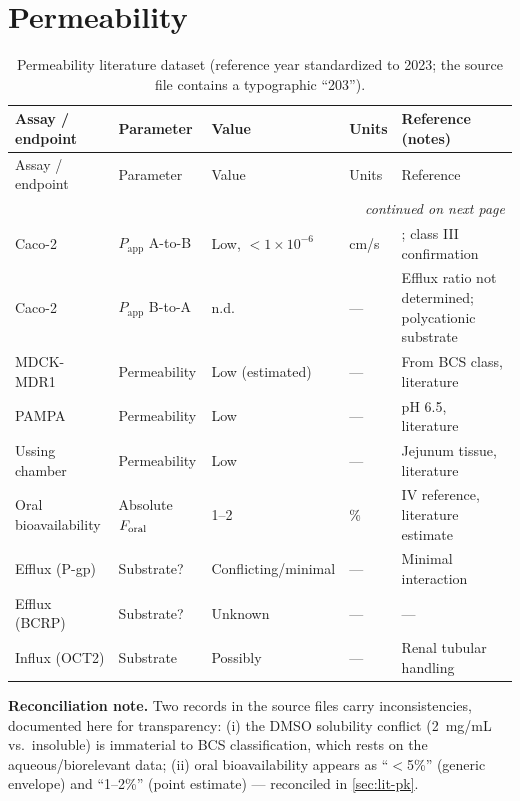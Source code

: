 \section{Permeability}
\small\setlength{\tabcolsep}{4pt}
\begin{longtable}{p{2.8cm}p{2.4cm}p{2.6cm}p{1.6cm}p{3.6cm}}
\caption{Permeability literature dataset (reference year standardized to 2023; the source file contains a typographic ``203'').}\label{tab:perm-full}\\
\toprule
Assay / endpoint & Parameter & Value & Units & Reference (notes)\\
\midrule
\endfirsthead
\toprule
Assay / endpoint & Parameter & Value & Units & Reference\\
\midrule
\endhead
\midrule
\multicolumn{5}{r}{\emph{continued on next page}}\\
\endfoot
\bottomrule
\endlastfoot
Caco-2 & $P_{\mathrm{app}}$ A-to-B & Low, $<1\times10^{-6}$ & cm/s & \citet{Asad2023}; class III confirmation\\
Caco-2 & $P_{\mathrm{app}}$ B-to-A & n.d. & --- & Efflux ratio not determined; polycationic substrate\\
MDCK-MDR1 & Permeability & Low (estimated) & --- & From BCS class, literature\\
PAMPA & Permeability & Low & --- & pH 6.5, literature\\
Ussing chamber & Permeability & Low & --- & Jejunum tissue, literature\\
Oral bioavailability & Absolute $F_{\mathrm{oral}}$ & 1--2 & \% & IV reference, literature estimate\\
Efflux (P-gp) & Substrate? & Conflicting/minimal & --- & Minimal interaction\\
Efflux (BCRP) & Substrate? & Unknown & --- & ---\\
Influx (OCT2) & Substrate & Possibly & --- & Renal tubular handling\\
\end{longtable}

\noindent\textbf{Reconciliation note.} Two records in the source files carry inconsistencies, documented here for transparency: (i) the DMSO solubility conflict (2~mg/mL vs.\ insoluble) is immaterial to BCS classification, which rests on the aqueous/biorelevant data; (ii) oral bioavailability appears as ``$<$5\%'' (generic envelope) and ``1--2\%'' (point estimate) --- reconciled in \cref{sec:lit-pk}.
